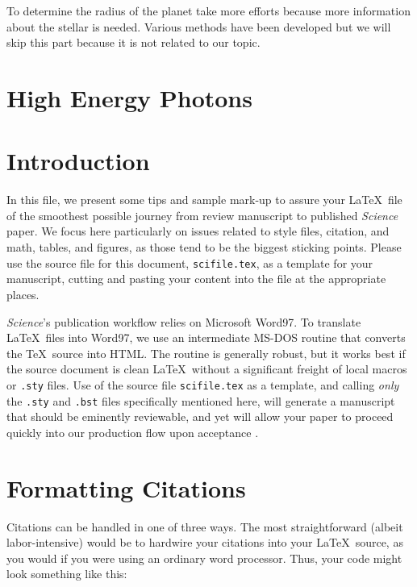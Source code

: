 \documentclass[12pt]{article}
\begin{document}
To determine the radius of the planet take more efforts because more information about the stellar is needed. Various methods have been developed but we will skip this part because it is not related to our topic.


\section*{High Energy Photons}













\section*{Introduction}

In this file, we present some tips and sample mark-up to assure your
\LaTeX\ file of the smoothest possible journey from review manuscript
to published {\it Science\/} paper.  We focus here particularly on
issues related to style files, citation, and math, tables, and
figures, as those tend to be the biggest sticking points.  Please use
the source file for this document, \texttt{scifile.tex}, as a template
for your manuscript, cutting and pasting your content into the file at
the appropriate places.

{\it Science\/}'s publication workflow relies on Microsoft Word97.  To
translate \LaTeX\ files into Word97, we use an intermediate MS-DOS
routine \cite{tth} that converts the \TeX\ source into HTML\@.  The
routine is generally robust, but it works best if the source document
is clean \LaTeX\ without a significant freight of local macros or
\texttt{.sty} files.  Use of the source file \texttt{scifile.tex} as a
template, and calling {\it only\/} the \texttt{.sty} and \texttt{.bst}
files specifically mentioned here, will generate a manuscript that
should be eminently reviewable, and yet will allow your paper to
proceed quickly into our production flow upon acceptance \cite{use2e}.


\section*{Formatting Citations}

Citations can be handled in one of three ways.  The most
straightforward (albeit labor-intensive) would be to hardwire your
citations into your \LaTeX\ source, as you would if you were using an
ordinary word processor.  Thus, your code might look something like
this:
\end{document}
